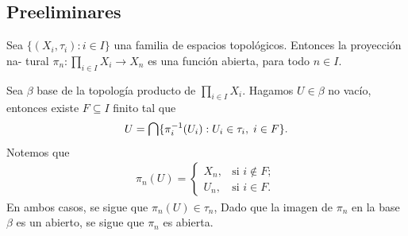 \begin{center}
    \section{Preeliminares}
\end{center}
\begin{prop}
\label{prop:pi_n_abierta}
    Sea $\{(X_i,\tau_i):i\in I\}$ una familia de espacios topológicos. Entonces la proyección na- tural $\pi_n:\prod_{i\in I}X_i\to X_n$ es una función abierta, para todo $n\in I$.
\end{prop}
\begin{dem}
    Sea $\beta$ base de la topología producto de $\prod_{i\in I}X_i$. Hagamos $U\in \beta$ no vacío, entonces existe $F\subseteq I$ finito tal que 
    \[
    U=\medcap\{\pi_i^{-1}(U_i):U_i\in\tau_i,\; i\in F\}.
    \]
    Notemos que 
    \begin{align*}
        \pi_n(U)=\begin{cases} 
        X_n, & \text{si } i\notin F; \\[1ex]
        U_n, & \text{si } i\in F.
    \end{cases}
    \end{align*}
    En ambos casos, se sigue que $\pi_n(U)\in \tau_n$, Dado que la imagen de $\pi_n$ en la base $\beta$ es un abierto, se sigue que $\pi_n$ es abierta.
\end{dem}
